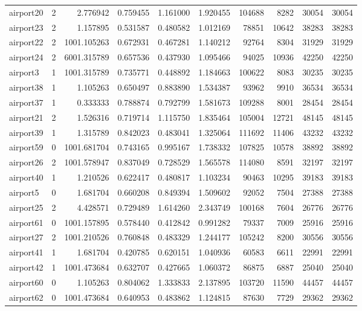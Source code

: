 \begin{longtable}{|l|r|r|r|r|r|r|r|r|r|}
airport20 & 2 & 2.776942 & 0.759455 & 1.161000 & 1.920455 & 104688 & 8282 & 30054 & 30054 \\
airport23 & 2 & 1.157895 & 0.531587 & 0.480582 & 1.012169 & 78851 & 10642 & 38283 & 38283 \\
airport22 & 2 & 1001.105263 & 0.672931 & 0.467281 & 1.140212 & 92764 & 8304 & 31929 & 31929 \\
airport24 & 2 & 6001.315789 & 0.657536 & 0.437930 & 1.095466 & 94025 & 10936 & 42250 & 42250 \\
airport3 & 1 & 1001.315789 & 0.735771 & 0.448892 & 1.184663 & 100622 & 8083 & 30235 & 30235 \\
airport38 & 1 & 1.105263 & 0.650497 & 0.883890 & 1.534387 & 93962 & 9910 & 36534 & 36534 \\
airport37 & 1 & 0.333333 & 0.788874 & 0.792799 & 1.581673 & 109288 & 8001 & 28454 & 28454 \\
airport21 & 2 & 1.526316 & 0.719714 & 1.115750 & 1.835464 & 105004 & 12721 & 48145 & 48145 \\
airport39 & 1 & 1.315789 & 0.842023 & 0.483041 & 1.325064 & 111692 & 11406 & 43232 & 43232 \\
airport59 & 0 & 1001.681704 & 0.743165 & 0.995167 & 1.738332 & 107825 & 10578 & 38892 & 38892 \\
airport26 & 2 & 1001.578947 & 0.837049 & 0.728529 & 1.565578 & 114080 & 8591 & 32197 & 32197 \\
airport40 & 1 & 1.210526 & 0.622417 & 0.480817 & 1.103234 & 90463 & 10295 & 39183 & 39183 \\
airport5 & 0 & 1.681704 & 0.660208 & 0.849394 & 1.509602 & 92052 & 7504 & 27388 & 27388 \\
airport25 & 2 & 4.428571 & 0.729489 & 1.614260 & 2.343749 & 100168 & 7604 & 26776 & 26776 \\
airport61 & 0 & 1001.157895 & 0.578440 & 0.412842 & 0.991282 & 79337 & 7009 & 25916 & 25916 \\
airport27 & 2 & 1001.210526 & 0.760848 & 0.483329 & 1.244177 & 105242 & 8200 & 30556 & 30556 \\
airport41 & 1 & 1.681704 & 0.420785 & 0.620151 & 1.040936 & 60583 & 6611 & 22991 & 22991 \\
airport42 & 1 & 1001.473684 & 0.632707 & 0.427665 & 1.060372 & 86875 & 6887 & 25040 & 25040 \\
airport60 & 0 & 1.105263 & 0.804062 & 1.333833 & 2.137895 & 103720 & 11590 & 44457 & 44457 \\
airport62 & 0 & 1001.473684 & 0.640953 & 0.483862 & 1.124815 & 87630 & 7729 & 29362 & 29362 \\

\end{longtable}
